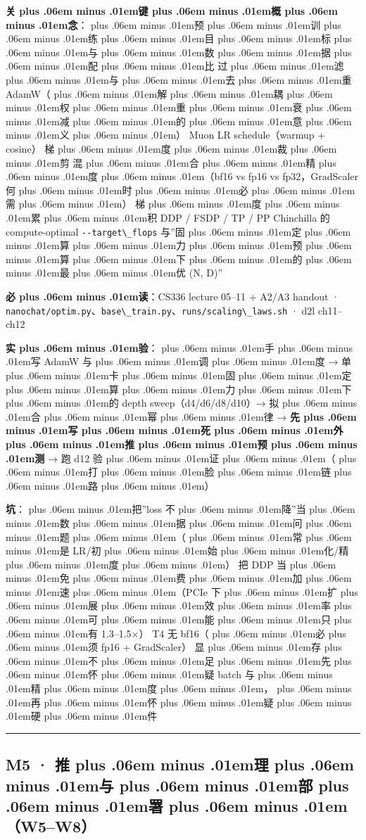 \documentclass[
]{article}
\newcommand{\passthrough}[1]{#1}
\def\zh#1{{\zhfont #1}}
\def\sym#1{{\symfont #1}}
\def\zhglue{\hskip0pt plus .06em minus .01em}
\begin{document}
\textbf{\zh{关\zhglue 键\zhglue 概\zhglue 念}}\zh{：\zhglue 预\zhglue 训\zhglue 练\zhglue 目\zhglue 标\zhglue 与\zhglue 数\zhglue 据\zhglue 配\zhglue 比} \textbar{} \zh{过\zhglue 滤\zhglue 与\zhglue 去\zhglue 重} \textbar{} AdamW\zh{（\zhglue 解\zhglue 耦\zhglue 权\zhglue 重\zhglue 衰\zhglue 减\zhglue 的\zhglue 意\zhglue 义\zhglue ）}\textbar{} Muon \textbar{} LR schedule\zh{（}warmup + cosine\zh{）}\textbar{} \zh{梯\zhglue 度\zhglue 裁\zhglue 剪} \textbar{} \zh{混\zhglue 合\zhglue 精\zhglue 度\zhglue （}bf16 vs fp16 vs fp32\zh{，}GradScaler \zh{何\zhglue 时\zhglue 必\zhglue 需\zhglue ）}\textbar{} \zh{梯\zhglue 度\zhglue 累\zhglue 积} \textbar{} DDP / FSDP / TP / PP \textbar{} Chinchilla \zh{的} compute-optimal \textbar{} \passthrough{\lstinline!--target\_flops!} \zh{与}''\zh{固\zhglue 定\zhglue 算\zhglue 力\zhglue 预\zhglue 算\zhglue 下\zhglue 的\zhglue 最\zhglue 优} (N, D)''

\textbf{\zh{必\zhglue 读}}\zh{：}CS336 lecture 05--11 + A2/A3 handout \sym{·} \passthrough{\lstinline!nanochat/optim.py!}\zh{、}\passthrough{\lstinline!base\_train.py!}\zh{、}\passthrough{\lstinline!runs/scaling\_laws.sh!} \sym{·} d2l ch11--ch12

\textbf{\zh{实\zhglue 验}}\zh{：\zhglue 手\zhglue 写} AdamW \zh{与\zhglue 调\zhglue 度} \sym{→} \zh{单\zhglue 卡\zhglue 固\zhglue 定\zhglue 算\zhglue 力\zhglue 下\zhglue 的} depth sweep\zh{（}d4/d6/d8/d10\zh{）}\sym{→} \zh{拟\zhglue 合\zhglue 幂\zhglue 律} \sym{→} \textbf{\zh{先\zhglue 写\zhglue 死\zhglue 外\zhglue 推\zhglue 预\zhglue 测}} \sym{→} \zh{跑} d12 \zh{验\zhglue 证\zhglue （\zhglue 打\zhglue 脸\zhglue 链\zhglue 路\zhglue ）}

\textbf{\zh{坑}}\zh{：\zhglue 把}''loss \zh{不\zhglue 降}''\zh{当\zhglue 数\zhglue 据\zhglue 问\zhglue 题\zhglue （\zhglue 常\zhglue 是} LR/\zh{初\zhglue 始\zhglue 化}/\zh{精\zhglue 度\zhglue ）}\textbar{} \zh{把} DDP \zh{当\zhglue 免\zhglue 费\zhglue 加\zhglue 速\zhglue （}PCIe \zh{下\zhglue 扩\zhglue 展\zhglue 效\zhglue 率\zhglue 可\zhglue 能\zhglue 只\zhglue 有} 1.3--1.5\sym{×}\zh{）}\textbar{} T4 \zh{无} bf16\zh{（\zhglue 必\zhglue 须} fp16 + GradScaler\zh{）}\textbar{} \zh{显\zhglue 存\zhglue 不\zhglue 足\zhglue 先\zhglue 怀\zhglue 疑} batch \zh{与\zhglue 精\zhglue 度\zhglue ，\zhglue 再\zhglue 怀\zhglue 疑\zhglue 硬\zhglue 件}

\begin{center}\rule{0.5\linewidth}{0.5pt}\end{center}

\subsection{M5 \sym{·} \zh{推\zhglue 理\zhglue 与\zhglue 部\zhglue 署\zhglue （}W5--W8\zh{）}}\label{m5-ux63a8ux7406ux4e0eux90e8ux7f72w5w8}
\end{document}

